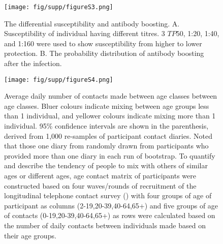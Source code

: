 \documentclass{article}
\begin{document}
\begin{figure}[h!]
      \texttt{[image: fig/supp/figureS3.png]}
      \caption{The differential susceptibility and antibody boosting. A. Susceptibility of individual having different titres. 3 $\mathit{TP50}$, 1:20, 1:40, and 1:160 were used to show susceptibility from higher to lower protection. B. The probability distribution of antibody boosting after the infection.}
\end{figure}
\clearpage





\begin{figure}[h!]
      \texttt{[image: fig/supp/figureS4.png]}
      \caption{ Average daily number of contacts made between age classes between age classes. Bluer colours indicate mixing between age groups less than 1 individual, and yellower colours indicate mixing more than 1 individual. 95\% confidence intervals are shown in the parenthesis, derived from 1,000 re-samples of participant contact diaries. Noted that those one diary from randomly drawn from participants who provided more than one diary in each run of bootstrap. To quantify and describe the tendency of people to mix with others of similar ages or different ages, age contact matrix of participants were constructed based on four waves/rounds of recruitment of the longitudinal telephone contact survey (\cite{KwokInprep}) with four groups of age of participant as columns (2-19,20-39,40-64,65+) and five groups of age of contacts (0-19,20-39,40-64,65+) as rows were calculated based on the number of daily contacts between individuals made based on their age groups.}
\end{figure}
\end{document}
